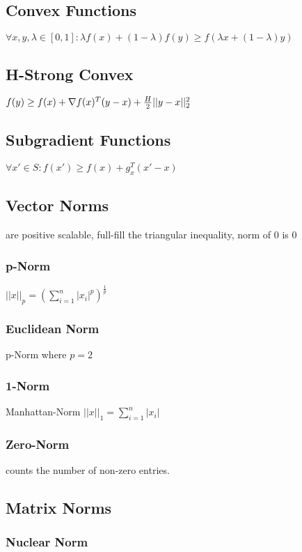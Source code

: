 \documentclass[a4paper,11pt,twocolumn]{article}
\begin{document}
\subsection{Convex Functions}
$\forall x,y, \lambda \in [0,1] : \lambda f(x) + (1-\lambda)f(y) \geq f(\lambda x +  (1-\lambda) y)$

\subsection{H-Strong Convex}
$f(y) \geq f(x) + \nabla f(x)^T(y-x) + {H \over 2 } || y - x ||_2^2$

\subsection{Subgradient Functions}
$\forall x' \in S : f(x') \geq f(x) + g_x^T(x'-x)$

\subsection{Vector Norms}
are positive scalable, full-fill the triangular inequality, norm of 0 is 0

\subsubsection{p-Norm}
$ || x ||_p = \left( \sum_{i=1}^{n}{|x_i|^p} \right)^{\frac{1}{p}}$

\subsubsection{Euclidean Norm} 
p-Norm where $p=2$

\subsubsection{1-Norm}
Manhattan-Norm
$ ||x||_1 = \sum_{i=1}^{n}{|x_i|} $

\subsubsection{Zero-Norm} 
counts the number of non-zero entries.

\subsection{Matrix Norms}

\subsubsection{Nuclear Norm}
\end{document}
